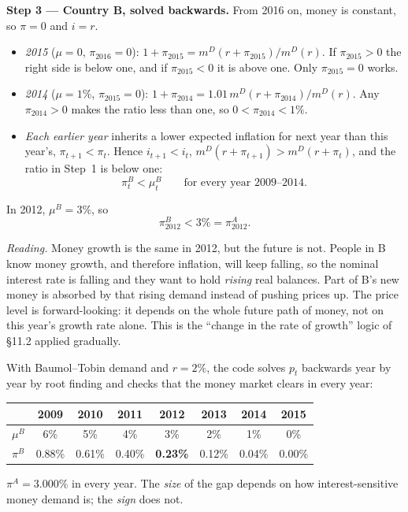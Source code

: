 \documentclass[12pt, letterpaper]{article}
\newcommand{\mD}{m^{D}}
\begin{document}
\begin{tcolorbox}[evenbox,title={Problem 11.4 \quad Growth in the Money Supply}]
\textbf{Step 3 --- Country B, solved backwards.} From 2016 on, money is constant, so $\pi=0$
and $i=r$.
\begin{itemize}
\item \emph{2015} ($\mu=0$, $\pi_{2016}=0$): $1+\pi_{2015}=\mD(r+\pi_{2015})/\mD(r)$. If
$\pi_{2015}>0$ the right side is below one, and if $\pi_{2015}<0$ it is above one. Only
$\pi_{2015}=0$ works.
\item \emph{2014} ($\mu=1\%$, $\pi_{2015}=0$): $1+\pi_{2014}=1.01\,\mD(r+\pi_{2014})/\mD(r)$. Any
$\pi_{2014}>0$ makes the ratio less than one, so $0<\pi_{2014}<1\%$.
\item \emph{Each earlier year} inherits a lower expected inflation for next year than this
year's, $\pi_{t+1}<\pi_t$. Hence $i_{t+1}<i_t$, $\mD(r+\pi_{t+1})>\mD(r+\pi_t)$, and the ratio in
Step~1 is below one:
\[
\pi^B_t<\mu^B_t\qquad\text{for every year }2009\text{--}2014.
\]
\end{itemize}
In 2012, $\mu^B=3\%$, so
\[
\boxed{\pi^B_{2012}<3\%=\pi^A_{2012}.}
\]

\emph{Reading.} Money growth is the same in 2012, but the future is not. People in B know money
growth, and therefore inflation, will keep falling, so the nominal interest rate is falling
and they want to hold \emph{rising} real balances. Part of B's new money is absorbed by that
rising demand instead of pushing prices up. The price level is forward-looking: it depends on
the whole future path of money, not on this year's growth rate alone. This is the
``change in the rate of growth'' logic of \S11.2 applied gradually.

\begin{tcolorbox}[databox]
With Baumol--Tobin demand and $r=2\%$, the code solves $p_t$ backwards year by year by root
finding and checks that the money market clears in every year:
\begin{center}
\small
\begin{tabular}{lccccccc}
\toprule
 & 2009 & 2010 & 2011 & 2012 & 2013 & 2014 & 2015\\
\midrule
$\mu^B$ & 6\% & 5\% & 4\% & 3\% & 2\% & 1\% & 0\%\\
$\pi^B$ & 0.88\% & 0.61\% & 0.40\% & \textbf{0.23\%} & 0.12\% & 0.04\% & 0.00\%\\
\bottomrule
\end{tabular}
\end{center}
$\pi^A=3.000\%$ in every year. The \emph{size} of the gap depends on how interest-sensitive money
demand is; the \emph{sign} does not.
\end{tcolorbox}


\end{tcolorbox}
\end{document}
